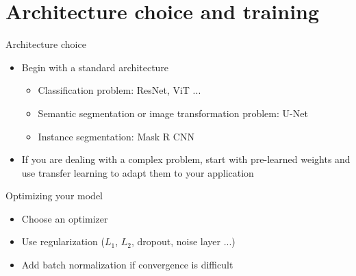 \documentclass[xcolor=pdftex,dvipsnames,table,mathserif]{beamer}
\begin{document}
\section{Architecture choice and training}

\begin{frame}{Architecture choice}

  \begin{itemize}[<+->]
  \item Begin with a standard architecture
    \begin{itemize}
    \item Classification problem: ResNet, ViT ...
    \item Semantic segmentation or image transformation problem: U-Net
    \item Instance segmentation: Mask R CNN
    \end{itemize}
  \item If you are dealing with a complex problem, start with pre-learned weights and use transfer learning to adapt them to your application
  \end{itemize}



\end{frame}



\begin{frame}{Optimizing your model}

  \begin{itemize}
  \item Choose an optimizer
  \item Use regularization ($L_1$, $L_2$, dropout, noise layer ...)
  \item Add batch normalization if convergence is difficult

  \end{itemize}

\end{frame}
\end{document}
